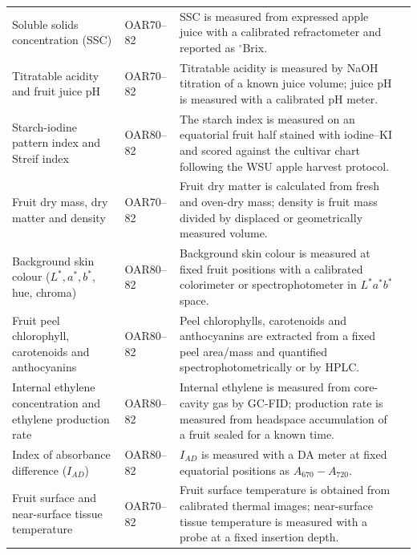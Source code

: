 \begin{landscape}
\begin{longtable}{>{\RaggedRight\arraybackslash}p{5.1cm} >{\RaggedRight\arraybackslash}p{2.3cm} >{\RaggedRight\arraybackslash}p{16.7cm} >{\RaggedRight\arraybackslash}p{2.4cm}}
Soluble solids concentration (SSC) &
OAR70--82 &
SSC is measured from expressed apple juice with a calibrated refractometer and reported as $^\circ$Brix. &
\citep{umd_apple_maturity}\\

Titratable acidity and fruit juice pH &
OAR70--82 &
Titratable acidity is measured by NaOH titration of a known juice volume; juice pH is measured with a calibrated pH meter. &
\citep{rutkowski2008,umd_apple_maturity}\\

Starch-iodine pattern index and Streif index &
OAR80--82 &
The starch index is measured on an equatorial fruit half stained with iodine--KI and scored against the cultivar chart following the WSU apple harvest protocol. &
\citep{wsu_apple_harvest}\\

Fruit dry mass, dry matter and density &
OAR70--82 &
Fruit dry matter is calculated from fresh and oven-dry mass; density is fruit mass divided by displaced or geometrically measured volume. &
\citep{vieira2022}\\

Background skin colour ($L^*,a^*,b^*$, hue, chroma) &
OAR80--82 &
Background skin colour is measured at fixed fruit positions with a calibrated colorimeter or spectrophotometer in $L^*a^*b^*$ space. &
\citep{felicetti2008}\\

Fruit peel chlorophyll, carotenoids and anthocyanins &
OAR80--82 &
Peel chlorophylls, carotenoids and anthocyanins are extracted from a fixed peel area/mass and quantified spectrophotometrically or by HPLC. &
\citep{felicetti2008}\\

Internal ethylene concentration and ethylene production rate &
OAR80--82 &
Internal ethylene is measured from core-cavity gas by GC-FID; production rate is measured from headspace accumulation of a fruit sealed for a known time. &
\citep{johnston2009}\\

Index of absorbance difference ($I_{AD}$) &
OAR80--82 &
$I_{AD}$ is measured with a DA meter at fixed equatorial positions as $A_{670}-A_{720}$. &
\citep{cocetta2017,umd_apple_maturity}\\

Fruit surface and near-surface tissue temperature &
OAR70--82 &
Fruit surface temperature is obtained from calibrated thermal images; near-surface tissue temperature is measured with a probe at a fixed insertion depth. &
\citep{li2014,wangfst2020}\\


\end{longtable}
\end{landscape}
